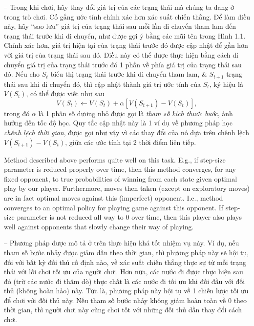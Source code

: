 \documentclass{article}
\begin{document}
\begin{itemize}
\begin{itemize}
        -- Trong khi chơi, hãy thay đổi giá trị của các trạng thái mà chúng ta đang ở trong trò chơi. Cố gắng ước tính chính xác hơn xác suất chiến thắng. Để làm điều này, hãy ``sao lưu'' giá trị của trạng thái sau mỗi lần di chuyển tham lam đến trạng thái trước khi di chuyển, như được gợi ý bằng các mũi tên trong Hình 1.1. Chính xác hơn, giá trị hiện tại của trạng thái trước đó được cập nhật để gần hơn với giá trị của trạng thái sau đó. Điều này có thể được thực hiện bằng cách di chuyển giá trị của trạng thái trước đó 1 phần về phía giá trị của trạng thái sau đó. Nếu cho $S_t$ biểu thị trạng thái trước khi di chuyển tham lam, \& $S_{t+1}$ trạng thái sau khi di chuyển đó, thì cập nhật thành giá trị ước tính của $S_t$, ký hiệu là $V(S_t)$, có thể được viết như sau
        \begin{equation*}
            V(S_t)\leftarrow V(S_t) + \alpha[V(S_{t+1}) - V(S_t)],
        \end{equation*}
        trong đó $\alpha$ là 1 phân số dương nhỏ được gọi là {\it tham số kích thước bước}, ảnh hưởng đến tốc độ học. Quy tắc cập nhật này là 1 ví dụ về phương pháp học {\it chênh lệch thời gian}, được gọi như vậy vì các thay đổi của nó dựa trên chênh lệch $V(S_{t+1}) - V(S_t)$, giữa các ước tính tại 2 thời điểm liên tiếp.

        Method described above performs quite well on this task. E.g., if step-size parameter is reduced properly over time, then this method converges, for any fixed opponent, to true probabilities of winning from each state given optimal play by our player. Furthermore, moves then taken (except on exploratory  moves) are in fact optimal moves against this (imperfect) opponent. I.e., method converges to an optimal policy for playing game against this opponent. If step-size parameter is not reduced all way to 0 over time, then this player also plays well against opponents that slowly change their way of playing.

        -- Phương pháp được mô tả ở trên thực hiện khá tốt nhiệm vụ này. Ví dụ, nếu tham số bước nhảy được giảm dần theo thời gian, thì phương pháp này sẽ hội tụ, đối với bất kỳ đối thủ cố định nào, về xác suất chiến thắng thực sự từ mỗi trạng thái với lối chơi tối ưu của người chơi. Hơn nữa, các nước đi được thực hiện sau đó (trừ các nước đi thăm dò) thực chất là các nước đi tối ưu khi đối đầu với đối thủ (không hoàn hảo) này. Tức là, phương pháp này hội tụ về 1 chiến lược tối ưu để chơi với đối thủ này. Nếu tham số bước nhảy không giảm hoàn toàn về 0 theo thời gian, thì người chơi này cũng chơi tốt với những đối thủ dần thay đổi cách chơi.


\end{itemize}
\end{itemize}
\end{document}

